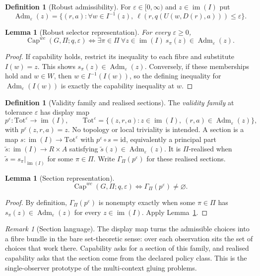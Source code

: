 \documentclass[11pt]{article}
\theoremstyle{plain}
\newtheorem{lemma}[theorem]{Lemma}
\theoremstyle{definition}
\newtheorem{definition}[theorem]{Definition}
\theoremstyle{remark}
\newtheorem{remark}[theorem]{Remark}
\newcommand{\im}{\operatorname{im}}
\newcommand{\Capability}{\operatorname{Cap}}
\newcommand{\Adm}{\operatorname{Adm}}
\newcommand{\eps}{\varepsilon}
\begin{document}
\begin{definition}[Robust admissibility]\label{def:eps}
For $\eps\in[0,\infty)$ and $z\in\im(I)$ put
\[
\Adm_\eps(z)=\{(r,a):\forall w\in I^{-1}(z),
\ \ell(r,q(U(w,D(r),a)))\le\eps\}.
\]
\end{definition}

\begin{lemma}[Robust selector representation]\label{lem:robust-selector}
For every $\eps\ge0$,
\[
\Capability^{wc}(G,\Pi;q,\eps)
\iff
\exists\pi\in\Pi\ \forall z\in\im(I)\ s_\pi(z)\in\Adm_\eps(z).
\]
\end{lemma}

\begin{proof}
If capability holds, restrict its inequality to each fibre and substitute
$I(w)=z$. This shows $s_\pi(z)\in\Adm_\eps(z)$. Conversely, if these memberships
hold and $w\in W$, then $w\in I^{-1}(I(w))$, so the defining inequality for
$\Adm_\eps(I(w))$ is exactly the capability inequality at $w$.
\end{proof}

\begin{definition}[Validity family and realised sections]\label{def:bundle}
The \emph{validity family} at tolerance $\eps$ has display map
\[
p^\eps:\mathrm{Tot}^\eps\to\im(I),\qquad
\mathrm{Tot}^\eps=
\{(z,r,a):z\in\im(I),\ (r,a)\in\Adm_\eps(z)\},
\]
with $p^\eps(z,r,a)=z$. No topology or local triviality is intended. A section
is a map $s:\im(I)\to\mathrm{Tot}^\eps$ with
$p^\eps\circ s=\mathrm{id}$, equivalently a principal part
$\widetilde s:\im(I)\to R\times A$ satisfying
$\widetilde s(z)\in\Adm_\eps(z)$. It is $\Pi$-realised when
$\widetilde s=s_\pi|_{\im(I)}$ for some $\pi\in\Pi$. Write
$\Gamma_\Pi(p^\eps)$ for these realised sections.
\end{definition}

\begin{lemma}[Section representation]\label{lem:section-representation}
\[
\Capability^{wc}(G,\Pi;q,\eps)
\iff
\Gamma_\Pi(p^\eps)\ne\varnothing.
\]
\end{lemma}

\begin{proof}
By definition, $\Gamma_\Pi(p^\eps)$ is nonempty exactly when some
$\pi\in\Pi$ has $s_\pi(z)\in\Adm_\eps(z)$ for every $z\in\im(I)$. Apply
Lemma~\ref{lem:robust-selector}.
\end{proof}

\begin{remark}[Section language]
The display map turns the admissible choices into a fibre bundle in the bare
set-theoretic sense: over each observation sits the set of choices that work
there. Capability asks for a section of this family, and realised capability asks
that the section come from the declared policy class. This is the
single-observer prototype of the multi-context gluing problems.
\end{remark}
\end{document}
